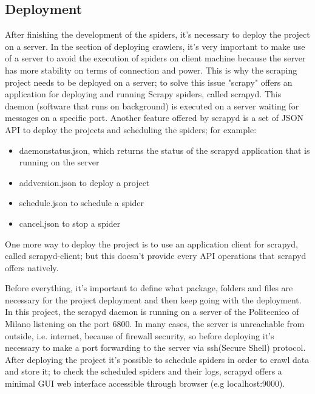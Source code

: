 \subsection{Deployment}
After finishing the development of the spiders, it's necessary to deploy the project on a server. In the section of deploying crawlers, it's very important to make use of a server to avoid the execution of spiders on client machine because the server has more stability on terms of connection and power. This is why the scraping project needs to be deployed on a server; to solve this issue "scrapy" offers an application for deploying and running Scrapy spiders, called scrapyd\cite{scrapyd}. This daemon (software that runs on background) is executed on a server waiting for messages on a specific port. Another feature offered by scrapyd is a set of JSON API to deploy the projects and scheduling the spiders; for example:
\begin{itemize}
	\item daemonstatus.json, which returns the status of the scrapyd application that is running on the server
	\item addversion.json to deploy a project
	\item schedule.json to schedule a spider
	\item cancel.json to stop a spider
\end{itemize}
One more way to deploy the project is to use an application client for scrapyd, called scrapyd-client\cite{scrapydclient}; but this doesn't provide every API operations that scrapyd offers natively.
\par
Before everything, it's important to define what package, folders and files are necessary for the project deployment and then keep going with the deployment. In this project, the scrapyd daemon is running on a server of the Politecnico of Milano listening on the port 6800. In many cases, the server is unreachable from outside, i.e. internet, because of firewall security, so before deploying it's necessary to make a port forwarding to the server via ssh(Secure Shell)\cite{ssh} protocol. After deploying the project it's possible to schedule spiders in order to crawl data and store it; to check the scheduled spiders and their logs, scrapyd offers a minimal GUI web interface accessible through browser (e.g localhost:9000).